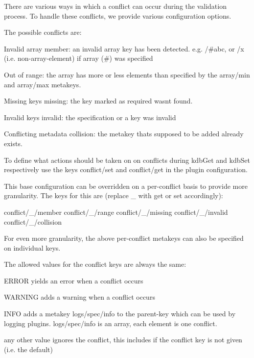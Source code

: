 There are various ways in which a conflict can occur during the validation process. To handle these conflicts, we provide various configuration options.

The possible conflicts are\+:


\begin{DoxyItemize}
\item Invalid array {\ttfamily member}\+: an invalid array key has been detected. e.\+g. {\ttfamily /\#abc}, or {\ttfamily /x} (i.\+e. non-\/array-\/element) if array ({\ttfamily \#}) was specified
\item Out of {\ttfamily range}\+: the array has more or less elements than specified by the {\ttfamily array/min} and {\ttfamily array/max} metakeys.
\item Missing keys {\ttfamily missing}\+: the key marked as {\ttfamily require}d wasn\textquotesingle{}t found.
\item Invalid keys {\ttfamily invalid}\+: the specification or a key was invalid
\item Conflicting metadata {\ttfamily collision}\+: the metakey that\textquotesingle{}s supposed to be added already exists.
\end{DoxyItemize}

To define what actions should be taken on on conflicts during {\ttfamily kdb\+Get} and {\ttfamily kdb\+Set} respectively use the keys {\ttfamily conflict/set} and {\ttfamily conflict/get} in the plugin configuration.

This base configuration can be overridden on a per-\/conflict basis to provide more granularity. The keys for this are (replace {\ttfamily \+\_\+} with {\ttfamily get} or {\ttfamily set} accordingly)\+:


\begin{DoxyCode}
conflict/\_/member
conflict/\_/range
conflict/\_/missing
conflict/\_/invalid
conflict/\_/collision
\end{DoxyCode}


For even more granularity, the above per-\/conflict metakeys can also be specified on individual keys.

The allowed values for the conflict keys are always the same\+:


\begin{DoxyItemize}
\item {\ttfamily E\+R\+R\+OR} yields an error when a conflict occurs
\item {\ttfamily W\+A\+R\+N\+I\+NG} adds a warning when a conflict occurs
\item {\ttfamily I\+N\+FO} adds a metakey {\ttfamily logs/spec/info} to the parent-\/key which can be used by logging plugins. {\ttfamily logs/spec/info} is an array, each element is one conflict.
\item any other value ignores the conflict, this includes if the conflict key is not given (i.\+e. the default)
\end{DoxyItemize}

